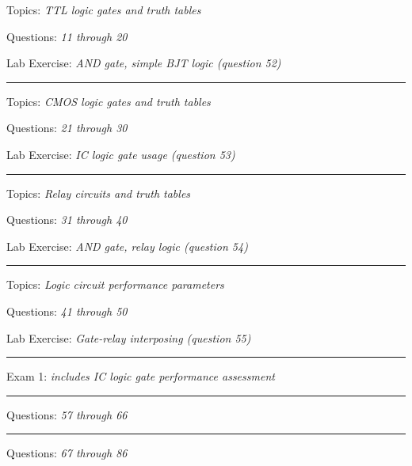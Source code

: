 \hskip 10pt Topics: {\it TTL logic gates and truth tables}
 
\hskip 10pt Questions: {\it 11 through 20}
 
\hskip 10pt Lab Exercise: {\it AND gate, simple BJT logic (question 52)}
 
\vskip 10pt
\hrule \vskip 5pt
\noindent
{}

\hskip 10pt Topics: {\it CMOS logic gates and truth tables}
 
\hskip 10pt Questions: {\it 21 through 30}
 
\hskip 10pt Lab Exercise: {\it IC logic gate usage (question 53)}
 
\vskip 10pt
\hrule \vskip 5pt
\noindent
{}

\hskip 10pt Topics: {\it Relay circuits and truth tables}
 
\hskip 10pt Questions: {\it 31 through 40}
 
\hskip 10pt Lab Exercise: {\it AND gate, relay logic (question 54)}
 

\vskip 10pt
\hrule \vskip 5pt
\noindent
{}

\hskip 10pt Topics: {\it Logic circuit performance parameters}
 
\hskip 10pt Questions: {\it 41 through 50}
 
\hskip 10pt Lab Exercise: {\it Gate-relay interposing (question 55)}
 


\vskip 10pt
\hrule \vskip 5pt
\noindent
{}

\hskip 10pt Exam 1: {\it includes IC logic gate performance assessment}
 
\vskip 10pt
\hrule \vskip 5pt
\noindent
{}

\hskip 10pt Questions: {\it 57 through 66}
 
\vskip 10pt
\hrule \vskip 5pt
\noindent
{}

\hskip 10pt Questions: {\it 67 through 86}
 
